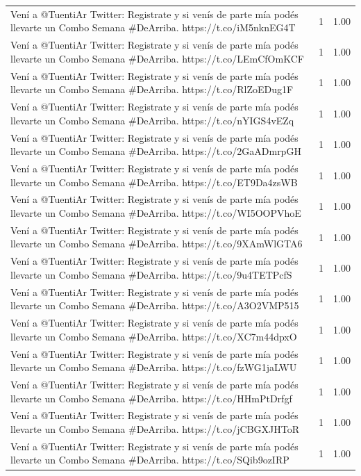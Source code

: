 \begin{longtable}{p{12.5cm}rr}
\bottomrule
\endlastfoot
Vení a @TuentiAr Twitter: Registrate y si venís de parte mía podés llevarte un Combo Semana \#DeArriba. https://t.co/iM5nknEG4T & 1 & 1.00 \\
Vení a @TuentiAr Twitter: Registrate y si venís de parte mía podés llevarte un Combo Semana \#DeArriba. https://t.co/LEmCfOmKCF & 1 & 1.00 \\
Vení a @TuentiAr Twitter: Registrate y si venís de parte mía podés llevarte un Combo Semana \#DeArriba. https://t.co/RlZoEDug1F & 1 & 1.00 \\
Vení a @TuentiAr Twitter: Registrate y si venís de parte mía podés llevarte un Combo Semana \#DeArriba. https://t.co/nYIGS4vEZq & 1 & 1.00 \\
Vení a @TuentiAr Twitter: Registrate y si venís de parte mía podés llevarte un Combo Semana \#DeArriba. https://t.co/2GaADmrpGH & 1 & 1.00 \\
Vení a @TuentiAr Twitter: Registrate y si venís de parte mía podés llevarte un Combo Semana \#DeArriba. https://t.co/ET9Da4zsWB & 1 & 1.00 \\
Vení a @TuentiAr Twitter: Registrate y si venís de parte mía podés llevarte un Combo Semana \#DeArriba. https://t.co/WI5OOPVhoE & 1 & 1.00 \\
Vení a @TuentiAr Twitter: Registrate y si venís de parte mía podés llevarte un Combo Semana \#DeArriba. https://t.co/9XAmWlGTA6 & 1 & 1.00 \\
Vení a @TuentiAr Twitter: Registrate y si venís de parte mía podés llevarte un Combo Semana \#DeArriba. https://t.co/9u4TETPcfS & 1 & 1.00 \\
Vení a @TuentiAr Twitter: Registrate y si venís de parte mía podés llevarte un Combo Semana \#DeArriba. https://t.co/A3O2VMP515 & 1 & 1.00 \\
Vení a @TuentiAr Twitter: Registrate y si venís de parte mía podés llevarte un Combo Semana \#DeArriba. https://t.co/XC7m44dpxO & 1 & 1.00 \\
Vení a @TuentiAr Twitter: Registrate y si venís de parte mía podés llevarte un Combo Semana \#DeArriba. https://t.co/fzWG1jaLWU & 1 & 1.00 \\
Vení a @TuentiAr Twitter: Registrate y si venís de parte mía podés llevarte un Combo Semana \#DeArriba. https://t.co/HHmPtDrfgf & 1 & 1.00 \\
Vení a @TuentiAr Twitter: Registrate y si venís de parte mía podés llevarte un Combo Semana \#DeArriba. https://t.co/jCBGXJHToR & 1 & 1.00 \\
Vení a @TuentiAr Twitter: Registrate y si venís de parte mía podés llevarte un Combo Semana \#DeArriba. https://t.co/SQib9ozIRP & 1 & 1.00 \\

\end{longtable}
